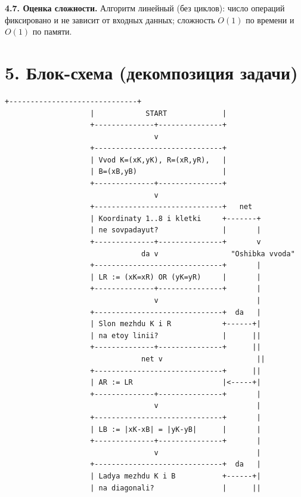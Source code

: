 \documentclass[12pt,a4paper]{article}
\begin{document}
\textbf{4.7. Оценка сложности.} Алгоритм линейный (без циклов):
число операций фиксировано и не зависит от входных данных;
сложность $O(1)$ по времени и $O(1)$ по памяти.

\section*{5. Блок-схема (декомпозиция задачи)}

\begin{Verbatim}[frame=single]
                    +------------------------------+
                    |            START             |
                    +--------------+---------------+
                                   v
                    +------------------------------+
                    | Vvod K=(xK,yK), R=(xR,yR),   |
                    | B=(xB,yB)                    |
                    +--------------+---------------+
                                   v
                    +------------------------------+   net
                    | Koordinaty 1..8 i kletki     +-------+
                    | ne sovpadayut?               |       |
                    +--------------+---------------+       v
                                da v                 "Oshibka vvoda"
                    +------------------------------+       |
                    | LR := (xK=xR) OR (yK=yR)     |       |
                    +--------------+---------------+       |
                                   v                       |
                    +------------------------------+  da   |
                    | Slon mezhdu K i R            +------+|
                    | na etoy linii?               |      ||
                    +--------------+---------------+      ||
                                net v                      ||
                    +------------------------------+      ||
                    | AR := LR                     |<-----+|
                    +--------------+---------------+       |
                                   v                       |
                    +------------------------------+       |
                    | LB := |xK-xB| = |yK-yB|      |       |
                    +--------------+---------------+       |
                                   v                       |
                    +------------------------------+  da   |
                    | Ladya mezhdu K i B           +------+|
                    | na diagonali?                |      ||

\end{Verbatim}
\end{document}
